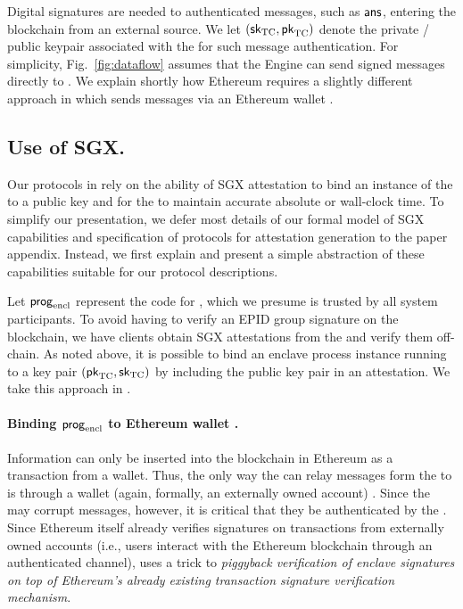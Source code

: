 Digital signatures are needed to authenticated messages, such as ${\sf ans}$, entering the blockchain from an external source. We let $({\sf sk}_{\textrm{TC}}, {\sf pk}_{\textrm{TC}})$ denote the private / public keypair associated with the \encname for such message authentication. For simplicity, Fig.~\ref{fig:dataflow} assumes that the Engine can send signed messages directly to \tcont. We explain shortly how Ethereum requires a slightly different approach in which \tc sends messages via an Ethereum wallet \tcadd.


\subsection{Use of SGX.}
Our protocols in \tc rely on the ability of SGX attestation to bind an instance of the \encname to a public key and for the \encname to maintain accurate absolute or wall-clock time. To simplify our presentation, we defer most details of our formal model of SGX capabilities and specification of protocols for attestation generation to the paper appendix. Instead, we first explain and present a simple abstraction of these capabilities suitable for our \tc protocol descriptions. 

Let ${\sf prog}_{\textrm{encl}}$ represent the code for \encname, which we presume is trusted by all system participants. To avoid having to verify an EPID group signature on the blockchain, we have clients obtain SGX attestations from the \medname and verify them off-chain. As noted above, it is possible to bind an enclave process instance running \enclaveprog to a key pair $({\sf pk}_{\textrm{TC}}, {\sf sk}_{\textrm{TC}})$ by including the public key pair in an attestation. We take this approach in \tc. 

\paragraph{Binding ${\sf prog}_{\textrm{encl}}$ to Ethereum wallet \tcadd.}
Information can only be inserted into the blockchain in Ethereum as a transaction from a wallet. Thus, the only way the \medname can relay messages form the \encname to \tcont is through a wallet (again, formally, an externally owned account) \tcadd. Since the \medname may corrupt messages, however, it is critical that they be authenticated by the \encname. Since Ethereum itself 
already verifies signatures on transactions from externally owned accounts (i.e., users interact with the  Ethereum blockchain through an authenticated channel), \tc uses a trick to {\it piggyback verification of enclave signatures on top of Ethereum's already existing transaction signature verification mechanism}. 


